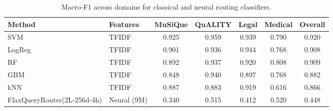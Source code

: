 \begin{table}[t]
\centering
\caption{Macro-F1 across domains for classical and neural routing classifiers.}
\begin{tabular}{llccccc}
\toprule
Method & Features & MuSiQue & QuALITY & Legal & Medical & Overall \\
\midrule
SVM & TFIDF & 0.925 & 0.959 & 0.939 & 0.790 & 0.920 \\
LogReg & TFIDF & 0.901 & 0.936 & 0.944 & 0.768 & 0.908 \\
RF & TFIDF & 0.892 & 0.937 & 0.920 & 0.808 & 0.909 \\
GBM & TFIDF & 0.848 & 0.940 & 0.897 & 0.768 & 0.882 \\
kNN & TFIDF & 0.887 & 0.883 & 0.919 & 0.616 & 0.866 \\
FlaxQueryRouter(2L-256d-4h) & Neural (9M) & 0.340 & 0.515 & 0.412 & 0.520 & 0.448 \\
\bottomrule
\end{tabular}
\end{table}